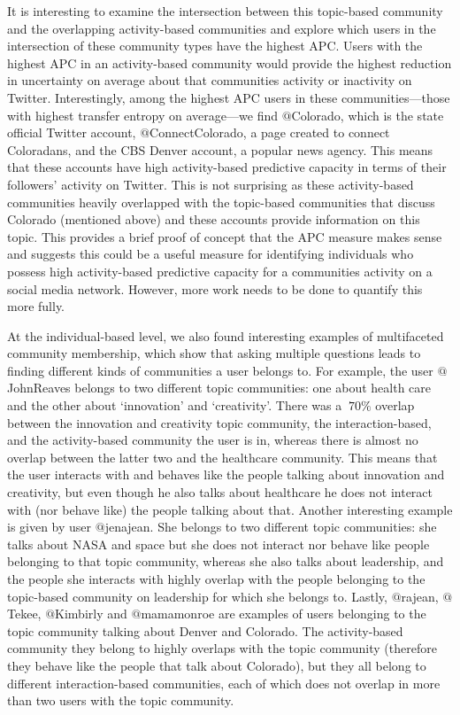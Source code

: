 \documentclass[10pt,letterpaper]{article}
\begin{document}
It is interesting to examine the intersection between this topic-based community and the overlapping activity-based communities and explore which users in the intersection of these community types have the highest APC. Users with the highest APC in an activity-based community would provide the highest reduction in uncertainty on average about that communities activity or inactivity on Twitter. Interestingly, among the highest APC users in these communities---those with highest transfer entropy on average---we find $@$Colorado, which is the state official Twitter account, $@$ConnectColorado, a page created to connect Coloradans, and the CBS Denver account, a popular news agency. This means that these accounts have high activity-based predictive capacity in terms of their followers' activity on Twitter. This is not surprising as these activity-based communities heavily overlapped with the topic-based communities that discuss Colorado (mentioned above) and these accounts provide information on this topic. This provides a brief proof of concept that the APC measure makes sense and suggests this could be a useful measure for identifying individuals who possess high activity-based predictive capacity for a communities activity on a social media network. However, more work needs to be done to quantify this more fully.

At the individual-based level, we also found interesting examples of multifaceted community membership, which show that asking multiple questions leads to finding different kinds of communities a user belongs to. For example, the user $@$JohnReaves belongs to two different topic communities: one about health care and the other about `innovation' and `creativity'. There was a $~70\%$ overlap between the innovation and creativity topic community, the interaction-based, and the activity-based community the user is in, whereas there is almost no overlap between the latter two and the healthcare community. This means that the user interacts with and behaves like the people talking about innovation and creativity, but even though he also talks about healthcare he does not interact with (nor behave like) the people talking about that.
Another interesting example is given by user $@$jenajean. She  belongs to two different topic communities: she talks about NASA and space but she does not interact nor behave like people belonging to that topic community, whereas she also talks about leadership, and the people she interacts with highly overlap with the people belonging to the topic-based community on leadership for which she belongs to.
Lastly, $@$rajean, $@$Tekee, $@$Kimbirly and $@$mamamonroe are examples of users belonging to the topic community talking about Denver and Colorado. The activity-based community they belong to highly overlaps with the topic community (therefore they behave like the people that talk about Colorado), but they all belong to different interaction-based communities, each of which does not overlap in more than two users with the topic community.
\end{document}

